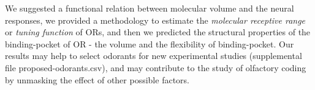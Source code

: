 \documentclass[fleqn,10pt]{wlscirep} %
\begin{document}
We suggested a functional relation between molecular volume and the neural responses, 
we provided a methodology to estimate the {\it molecular receptive range} or {\it tuning function} of ORs,
and then we predicted the structural properties of the binding-pocket of OR - the volume and the flexibility of binding-pocket.
Our results may help to select odorants  for new experimental studies (supplemental file proposed-odorants.csv), 
and may contribute to the study of olfactory coding by unmasking the effect of other possible factors.














 
\end{document}
